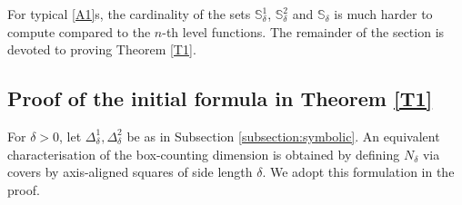 \documentclass[a4paper, 11pt]{article}
\numberwithin{equation}{section}
\theoremstyle{plain}
\theoremstyle{remark}
\theoremstyle{definition}
\begin{document}
For typical \ref{A1}s, the cardinality of the sets $\mathbb{S}_\delta^1$, $\mathbb{S}_\delta^2$ and $\mathbb{S}_\delta$ is much harder to compute compared to the $n$-th level functions. The remainder of the section is devoted to proving Theorem \ref{T1}.


\subsection{Proof of the initial formula in Theorem \ref{T1}}

For $\delta>0$, let $\Delta_\delta^1, \Delta_\delta^2$ be as in Subsection \ref{subsection:symbolic}. An equivalent characterisation of the box-counting dimension is obtained by defining $N_\delta$ via covers by axis-aligned squares of side length $\delta$. We adopt this formulation in the proof.
\end{document}
